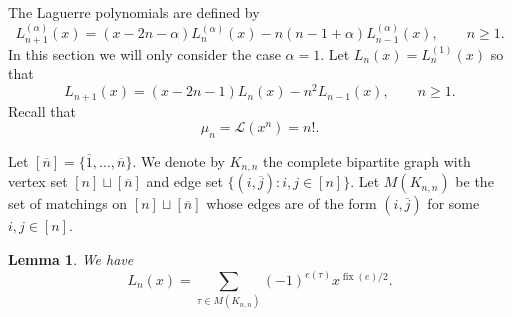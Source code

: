 \documentclass[oneside]{book}
\numberwithin{equation}{section}
\newtheorem{lem}[thm]{Lemma}
\theoremstyle{definition}
\newcommand\fix{\operatorname{fix}}
\newcommand\LL{\mathcal{L}}
\begin{document}
The Laguerre polynomials are defined by
\[
  L^{(\alpha)}_{n+1}(x) = (x-2n-\alpha) L^{(\alpha)}_n(x) - n(n-1+\alpha) L^{(\alpha)}_{n-1}(x), \qquad n\ge1.
\]
In this section we will only consider the case \( \alpha=1 \). Let
\( L_n(x) = L^{(1)}_n(x) \) so that
\begin{equation}\label{eq:78}
  L_{n+1}(x) = (x-2n-1) L_n(x) - n^2 L_{n-1}(x), \qquad n\ge1.
\end{equation}
Recall that
\[
  \mu_n = \LL(x^n) = n!.
\]

Let \( [\overline{n}] = \{ \overline{1},\dots,\overline{n}\} \). We
denote by \( K_{n,n} \) the complete bipartite graph with vertex set
\( [n]\sqcup [\overline{n}] \) and edge set
\( \{(i,\overline{j}): i,j\in [n]\} \). Let \( M(K_{n,n}) \) be the
set of matchings on \( [n]\sqcup [\overline{n}] \) whose edges are of
the form \( (i,\overline{j}) \) for some \( i,j\in [n] \).


\begin{lem}
  We have
  \begin{equation}\label{eq:77}
    L_{n}(x) = \sum_{\tau\in M(K_{n,n})} (-1)^{e(\tau)} x^{\fix(e)/2}.
  \end{equation}
\end{lem}
\end{document}
